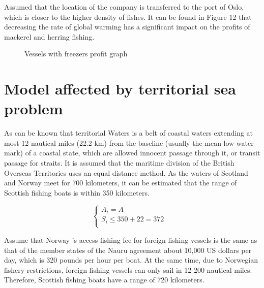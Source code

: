 \documentclass{mcmthesis}
\begin{document}
Assumed that the location of the company is transferred to the port of Oslo, which is closer to the higher density of fishes. It can be found in Figure 12 that decreasing the rate of global warming has a significant impact on the profits of mackerel and herring fishing.

\begin{figure}[htbp]
  \centering
  \centering
  \caption{Vessels with freezers profit graph}
\end{figure}

\section{Model affected by territorial sea problem}
As can be known that territorial Waters is a belt of coastal waters extending at most 12 nautical miles (22.2 km) from the baseline (usually the mean low-water mark) of a coastal state, which are allowed innocent passage through it, or transit passage for straits.
It is assumed that the maritime division of the British Overseas Territories uses an equal distance method. As the waters of Scotland and Norway meet for 700 kilometers, it can be estimated that the range of Scottish fishing boats is within 350 kilometers.

\begin{equation}
\left\{
\begin{array}{lr}
A_i=A &\\
S_i \leq 350+22 =372 \\
\end{array}
\right.
\end{equation}



Assume that Norway ’s access fishing fee for foreign fishing vessels is the same as that of the member states of the Nauru agreement about 10,000 US dollars per day, which is 320 pounds per hour per boat. At the same time, due to Norwegian fishery restrictions, foreign fishing vessels can only sail in 12-200 nautical miles. Therefore, Scottish fishing boats have a range of 720 kilometers.
\end{document}
